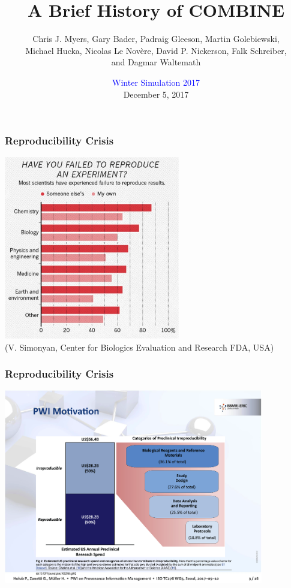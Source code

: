 \documentclass{beamer}
\title[A Brief History of COMBINE]{A Brief History of COMBINE}
\author[Chris J. Myers et al.]{Chris J. Myers, Gary Bader, Padraig Gleeson, Martin Golebiewski, \\ 
Michael Hucka, Nicolas Le Nov\`{e}re, David P. Nickerson, Falk Schreiber, \\
and Dagmar Waltemath}
\institute[COMBINE]{\textcolor{red}{\normalsize COMBINE}}
\date[WSC 2017 / December 5, 2017]{\textcolor{blue}{Winter Simulation 2017}\\December 5, 2017}
\begin{document}
\begin{frame}
  \titlepage
\end{frame}

\begin{frame}\frametitle{Reproducibility Crisis}
\begin{center}
\includegraphics[width=0.575\textwidth]{figs/FailureToReproduce}\\
{\footnotesize (V. Simonyan, Center for Biologics Evaluation and Research FDA, USA)}
\end{center}
\end{frame}

\begin{frame}\frametitle{Reproducibility Crisis}
\begin{center}
\includegraphics[width=0.85\textwidth]{figs/FailureToReproduce2}
\end{center}
\end{frame}
\end{document}
